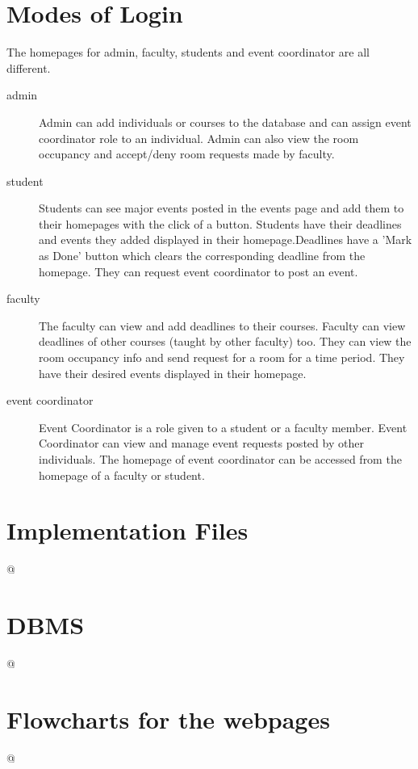 \documentclass{article}
\begin{document}
\section{Modes of Login}
The homepages for admin, faculty, students and event coordinator are all different. 
\begin{description}

    \item[admin] Admin can add individuals or courses to the database and can assign event coordinator role to an individual. Admin can also view the room occupancy and accept/deny room requests made by faculty.
    \item [student] Students can see major events posted in the events page and add them to their homepages with the click of a button. Students have their deadlines and events they added displayed in their homepage.Deadlines have a 'Mark as Done' button which clears the corresponding deadline from the homepage. They can request event coordinator to post an event.
    \item [faculty] The faculty can view and add deadlines to their courses. Faculty can view deadlines of other courses (taught by other faculty) too. They can view the room occupancy info and send request for a room for a time period. They have their desired events displayed in their homepage.
    \item [event coordinator] Event Coordinator is a role given to a student or a faculty member. Event Coordinator can view and manage event requests posted by other individuals. The homepage of event coordinator can be accessed from the homepage of a faculty or student.
\end{description}

\section{Implementation Files}
@

\section{DBMS}
@

\section{Flowcharts for the webpages}
@
\end{document}
